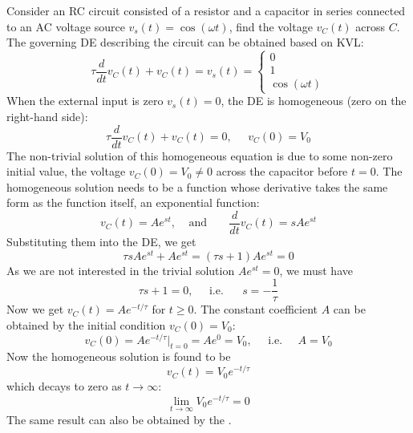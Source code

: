 \documentclass{article}
\begin{document}
Consider an RC circuit consisted of a resistor and a capacitor in series 
connected to an AC voltage source $v_s(t)=\cos(\omega t)$, find the voltage
$v_C(t)$ across $C$. The governing DE describing the circuit can be obtained 
based on KVL:
\begin{equation}
  \tau\frac{d}{dt}v_C(t)+v_C(t)=v_s(t)
  =\left\{\begin{array}{c}0\\1\\\cos(\omega t)\end{array}\right.
\end{equation}
When the external input is zero $v_s(t)=0$, the DE is homogeneous (zero 
on the right-hand side):
\begin{equation}
  \tau\frac{d}{dt}v_C(t)+v_C(t)=0,\;\;\;\;\;v_C(0)=V_0
\end{equation}
The non-trivial solution of this homogeneous equation is due to some 
non-zero initial value, the voltage $v_C(0)=V_0\ne 0$ across the capacitor
before $t=0$. The homogeneous solution needs to be a function whose 
derivative takes the same form as the function itself, an exponential
function:
\begin{equation}
  v_C(t)=A e^{st},\;\;\;\;\mbox{and}\;\;\;\;\;\;\;\frac{d}{dt}v_C(t)=s A e^{st}
\end{equation}
Substituting them into the DE, we get
\begin{equation}
  \tau sA e^{st} + Ae^{st}=(\tau s+1) Ae^{st}=0 
\end{equation}
As we are not interested in the trivial solution $Ae^{st}=0$, we must 
have
\begin{equation} 
  \tau s+1=0,\;\;\;\;\;\mbox{i.e.}\;\;\;\;\;\;s=-\frac{1}{\tau} 
\end{equation}
Now we get $v_C(t)=Ae^{-t/\tau}$ for $t\ge 0$. The constant coefficient 
$A$ can be obtained by the initial condition $v_C(0)=V_0$:
\begin{equation} 
  v_C(0)=A e^{-t/\tau}\bigg|_{t=0}=A e^{0}=V_0,
\;\;\;\;\;\mbox{i.e.}\;\;\;\;\;A=V_0	
\end{equation}
Now the homogeneous solution is found to be
\begin{equation}
  v_C(t)=V_0 e^{-t/\tau}		
\end{equation}
which decays to zero as $t\rightarrow\infty$:
\begin{equation}
  \lim_{t\rightarrow\infty} V_0 e^{-t/\tau}=0
\end{equation}
The same result can also be obtained by the
.
\end{document}
